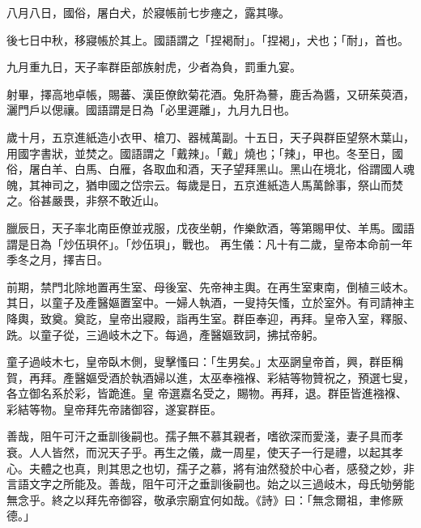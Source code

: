 \begin{pinyinscope}
 八月八日，國俗，屠白犬，於寢帳前七步瘞之，露其喙。



 後七日中秋，移寢帳於其上。國語謂之「捏褐耐」。「捏褐」，犬也；「耐」，首也。



 九月重九日，天子率群臣部族射虎，少者為負，罰重九宴。



 射畢，擇高地卓帳，賜蕃、漢臣僚飲菊花酒。兔肝為謩，鹿舌為醬，又研茱萸酒，灑門戶以偲禳。國語謂是日為「必里遲離」，九月九日也。



 歲十月，五京進紙造小衣甲、槍刀、器械萬副。十五日，天子與群臣望祭木葉山，用國字書狀，並焚之。國語謂之「戴辣」。「戴」燒也；「辣」，甲也。冬至日，國俗，屠白羊、白馬、白雁，各取血和酒，天子望拜黑山。黑山在境北，俗謂國人魂魄，其神司之，猶申國之岱宗云。每歲是日，五京進紙造人馬萬餘事，祭山而焚之。俗甚嚴畏，非祭不敢近山。



 臘辰日，天子率北南臣僚並戎服，戊夜坐朝，作樂飲酒，等第賜甲仗、羊馬。國語謂是日為「炒伍珼伓」。「炒伍珼」，戰也。
 再生儀：凡十有二歲，皇帝本命前一年季冬之月，擇吉日。



 前期，禁門北除地置再生室、母後室、先帝神主輿。在再生室東南，倒植三岐木。其日，以童子及產醫嫗置室中。一婦人執酒，一叟持矢慅，立於室外。有司請神主降輿，致奠。奠訖，皇帝出寢殿，詣再生室。群臣奉迎，再拜。皇帝入室，釋服、跣。以童子從，三過岐木之下。每過，產醫嫗致詞，拂拭帝躬。



 童子過岐木七，皇帝臥木側，叟擊慅曰：「生男矣。」太巫誷皇帝首，興，群臣稱賀，再拜。產醫嫗受酒於執酒婦以進，太巫奉襁褓、彩結等物贊祝之，預選七叟，各立御名系於彩，皆跪進。皇
 帝選嘉名受之，賜物。再拜，退。群臣皆進襁褓、彩結等物。皇帝拜先帝諸御容，遂宴群臣。



 善哉，阻午可汗之垂訓後嗣也。孺子無不慕其親者，嗜欲深而愛淺，妻子具而孝衰。人人皆然，而況天子乎。再生之儀，歲一周星，使天子一行是禮，以起其孝心。夫體之也真，則其思之也切，孺子之慕，將有油然發於中心者，感發之妙，非言語文字之所能及。善哉，阻午可汗之垂訓後嗣也。始之以三過岐木，母氏劬勞能無念乎。終之以拜先帝御容，敬承宗廟宜何如哉。《詩》曰：「無念爾祖，聿修厥德。」



\end{pinyinscope}